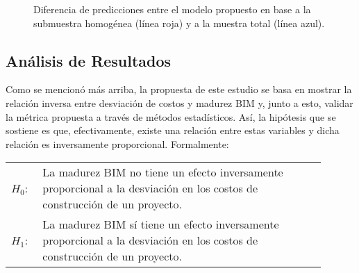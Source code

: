 \begin{figure}[H]
    \centering
    \caption{Diferencia de predicciones entre el modelo propuesto en base a la submuestra homogénea (línea roja) y a la muestra total (línea azul).}
\end{figure}


\subsection{Análisis de Resultados}

Como se mencionó más arriba, la propuesta de este estudio se basa en mostrar la relación inversa entre desviación de costos y madurez BIM y, junto a esto, validar la métrica propuesta a través de métodos estadísticos. Así, la hipótesis que se sostiene es que, efectivamente, existe una relación entre estas variables y dicha relación es inversamente proporcional. Formalmente:

\begin{table}[H]
    \begin{tabular}{l p{0.9\linewidth}}
        $H_0$: & La madurez BIM no tiene un efecto inversamente proporcional a la desviación en los costos de construcción de un proyecto. \\

        $H_1$: & La madurez BIM sí tiene un efecto inversamente proporcional a la desviación en los costos de construcción de un proyecto.
    \end{tabular}
\end{table}

